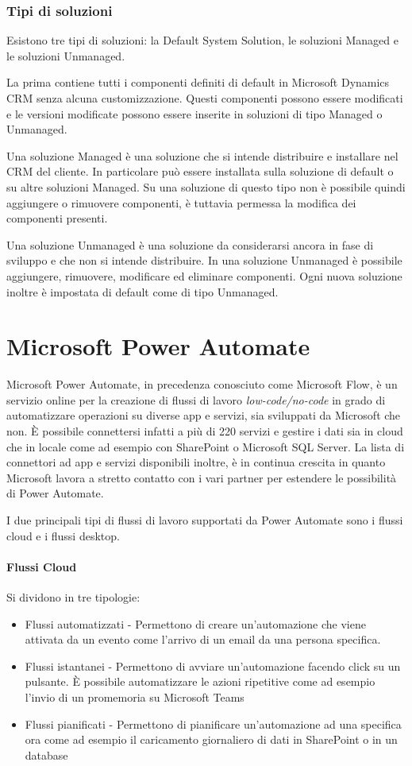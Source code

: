 \subsubsection{Tipi di soluzioni}
Esistono tre tipi di soluzioni: la Default System Solution, le soluzioni Managed e le soluzioni Unmanaged.

La prima contiene tutti i componenti definiti di default in Microsoft Dynamics CRM senza alcuna customizzazione. Questi componenti possono essere modificati e le versioni modificate possono essere inserite in soluzioni di tipo Managed o Unmanaged.

Una soluzione Managed è una soluzione che si intende distribuire e installare nel CRM del cliente. In particolare può essere installata sulla soluzione di default o su altre soluzioni Managed. Su una soluzione di questo tipo non è possibile quindi aggiungere o rimuovere componenti, è tuttavia permessa la modifica dei componenti presenti.

Una soluzione Unmanaged è una soluzione da considerarsi ancora in fase di sviluppo e che non si intende distribuire. In una soluzione Unmanaged è possibile aggiungere, rimuovere, modificare ed eliminare componenti. Ogni nuova soluzione inoltre è impostata di default come di tipo Unmanaged.

\section{Microsoft Power Automate}
Microsoft Power Automate, in precedenza conosciuto come Microsoft Flow, è un servizio online per la creazione di flussi di lavoro \textit{low-code/no-code} in grado di automatizzare operazioni su diverse app e servizi, sia sviluppati da Microsoft che non.
È possibile connettersi infatti a più di 220 servizi e gestire i dati sia in cloud che in locale come ad esempio con SharePoint o Microsoft SQL Server. La lista di connettori ad app e servizi disponibili inoltre, è in continua crescita in quanto Microsoft lavora a stretto contatto con i vari partner per estendere le possibilità di Power Automate.

I due principali tipi di flussi di lavoro supportati da Power Automate sono i flussi cloud e i flussi desktop.
\paragraph{Flussi Cloud} Si dividono in tre tipologie:
\begin{itemize}
  \item Flussi automatizzati - Permettono di creare un'automazione che viene attivata da un evento come l'arrivo di un email da una persona specifica. 
  \item Flussi istantanei - Permettono di avviare un'automazione facendo click su un pulsante. È possibile automatizzare le azioni ripetitive come ad esempio l'invio di un promemoria su Microsoft Teams
  \item Flussi pianificati - Permettono di pianificare un'automazione ad una specifica ora come ad esempio il caricamento giornaliero di dati in SharePoint o in un database
\end{itemize}

